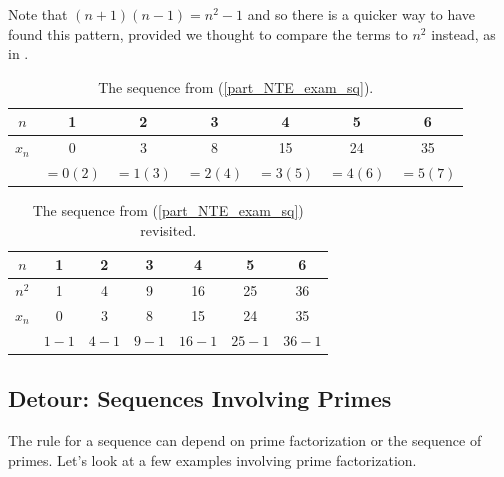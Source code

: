 \begin{exam}
\begin{apart}
\begin{soln}
                    Note that $(n+1)(n-1) = n^2-1$ and so there is a quicker way to have found this pattern, provided we thought to compare the terms to $n^2$ instead, as in .
                \end{soln}
                \begin{table}[hbtp]
                    \centering
                    \begin{tabular}{c|c|c|c|c|c|c}
                        $n$ & 1 & 2 & 3 & 4 & 5 & 6   \\ \hline
                        $x_n$ & 0 & 3 & 8 & 15 & 24 & 35\\
                        & $=0(2)$ & $=1(3)$ & $=2(4)$ & $=3(5)$ & $=4(6)$ & $=5(7)$ \\
                    \end{tabular}
                    \caption{The sequence from  (\ref{part_NTE_exam_sq}).}
                    \label{tab_NTE_exam_sq}
                \end{table}
                \begin{table}[hbtp]
                    \centering
                    \begin{tabular}{c|c|c|c|c|c|c}
                        $n$ & 1 & 2 & 3 & 4 & 5 & 6   \\ \hline
                        $n^2$ & 1 & 4 & 9 & 16 & 25 & 36 \\ \hline
                        $x_n$ & 0 & 3 & 8 & 15 & 24 & 35\\
                        & $1-1$ & $4-1$ & $9-1$ & $16-1$ & $25-1$ & $36-1$ \\
                    \end{tabular}
                    \caption{The sequence from  (\ref{part_NTE_exam_sq}) revisited.}
                    \label{tab_NTE_exam_sq_easier}
                \end{table} 
        \end{apart}
\end{exam}

\newcommand{\subseqprimes}{Detour: Sequences Involving Primes}
\subsection{\subseqprimes}
\label{sub_seq_primes}

The rule for a sequence can depend on prime factorization or the sequence of primes.  Let's look at a few examples involving prime factorization.

